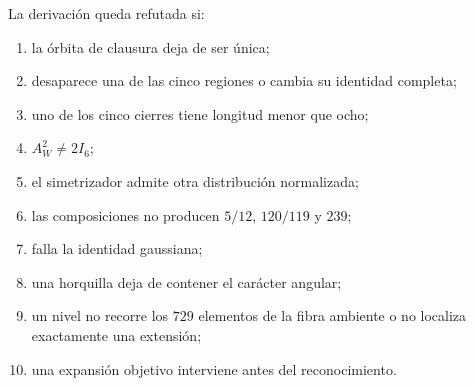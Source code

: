 \begin{criterion}
La derivación queda refutada si:
\begin{enumerate}
 \item la órbita de clausura deja de ser única;
 \item desaparece una de las cinco regiones o cambia su identidad completa;
 \item uno de los cinco cierres tiene longitud menor que ocho;
 \item \(A_W^2\ne2I_6\);
 \item el simetrizador admite otra distribución normalizada;
 \item las composiciones no producen \(5/12\), \(120/119\) y \(239\);
 \item falla la identidad gaussiana;
 \item una horquilla deja de contener el carácter angular;
 \item un nivel no recorre los \(729\) elementos de la fibra ambiente o no
       localiza exactamente una extensión;
 \item una expansión objetivo interviene antes del reconocimiento.
\end{enumerate}
\end{criterion}
